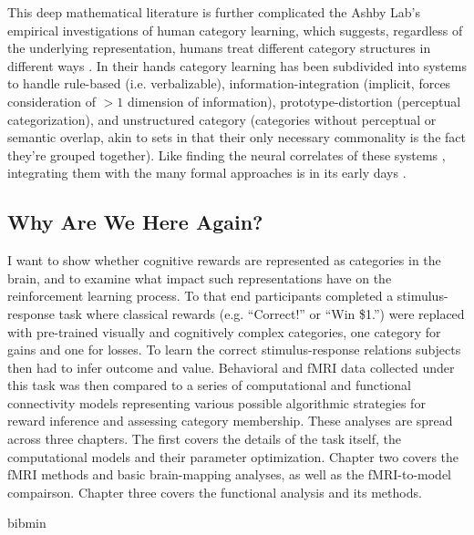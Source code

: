 \documentclass[doc,12pt]{apa}        %
\begin{document}
This deep mathematical literature is further complicated the Ashby Lab's empirical investigations of human category learning, which suggests, regardless of the underlying representation, humans treat different category structures in different ways \cite{Ashby:2011p9148}.  In their hands category learning has been subdivided
into systems to handle rule-based (i.e. verbalizable), information-integration (implicit, forces consideration of $>1$ dimension of information), prototype-distortion (perceptual categorization), and unstructured category (categories without perceptual or semantic overlap, akin to sets in that their only necessary commonality is the fact they're grouped together).  Like finding the neural correlates of these systems \cite{Ashby:2005p9152,Ashby:2006p9153}, integrating them with the many formal approaches is in its early days \cite{Ashby:2011p9148}.

\subsection{Why Are We Here Again?}
\label{sec:goals}
I want to show whether cognitive rewards are represented as categories in the brain, and to examine what impact such representations have on the reinforcement learning process.  To that end participants completed a stimulus-response task where classical rewards (e.g. ``Correct!'' or ``Win \$1.'') were replaced with pre-trained visually and cognitively complex categories, one category for gains and one for losses.  To learn the correct stimulus-response relations subjects then had to infer outcome and value.   Behavioral and fMRI data collected under this task was then compared to a series of computational and functional connectivity models representing various possible algorithmic strategies for reward inference and assessing category membership.  These analyses are spread across three chapters.  The first covers the details of the task itself, the computational models and their parameter optimization.  Chapter two covers the fMRI methods and basic brain-mapping analyses, as well as the fMRI-to-model compairson.  Chapter three covers the functional analysis and its methods.

\newpage
 {bibmin}
\end{document}
